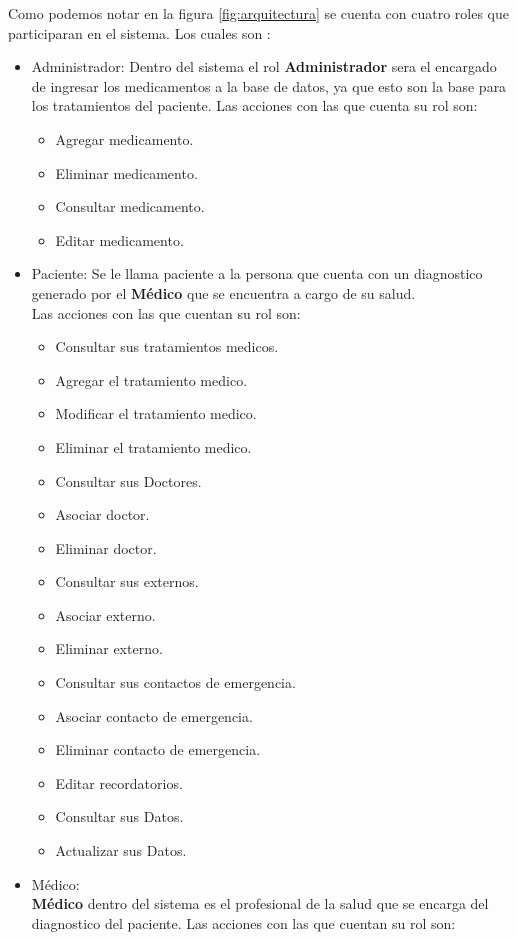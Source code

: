 Como podemos notar en la figura \ref{fig:arquitectura} se cuenta con cuatro roles que participaran en el sistema. Los cuales son :
\begin{itemize}
	\item Administrador: Dentro del sistema el rol \textbf{Administrador} sera el encargado de ingresar los medicamentos a la base de datos, ya que esto son la base para los tratamientos del paciente.
	Las acciones con las que cuenta su rol son:
	\begin{itemize}
		\item Agregar medicamento.
		\item Eliminar medicamento.
		\item Consultar medicamento.
		\item Editar medicamento.
	\end{itemize}
	
	
	\item Paciente: Se le llama paciente a la persona que cuenta con un diagnostico generado por el \textbf{Médico} que se encuentra a cargo de su salud.\\
	
	Las acciones con las que cuentan su rol son:
	\begin{itemize}
		\item Consultar sus tratamientos medicos.
		\item Agregar el tratamiento medico.
		\item Modificar el tratamiento medico.
		\item Eliminar el tratamiento medico.
		\item Consultar sus Doctores.
		\item Asociar doctor.
		\item Eliminar doctor.
		\item Consultar sus externos.
		\item Asociar externo.
		\item Eliminar externo.
		\item Consultar sus contactos de emergencia.
		\item Asociar contacto de emergencia.
		\item Eliminar contacto de emergencia.
		\item Editar recordatorios.
		\item Consultar sus Datos.
		\item Actualizar sus Datos.
	\end{itemize}

	\item Médico: \\ \textbf{Médico} dentro del sistema es el profesional de la salud que se encarga del diagnostico del paciente.
	Las acciones con las que cuentan su rol son:
		\begin{itemize}
			

\end{itemize}
\end{itemize}

